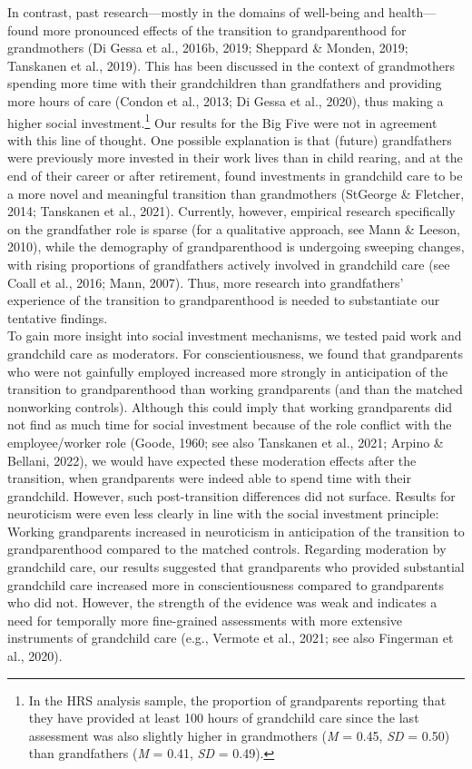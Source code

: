 \documentclass[
  english,
  man,floatsintext]{apa7}
\begin{document}
In contrast, past research---mostly in the domains of well-being and health---found more pronounced effects of the transition to grandparenthood for grandmothers (Di Gessa et al., 2016b, 2019; Sheppard \& Monden, 2019; Tanskanen et al., 2019). This has been discussed in the context of grandmothers spending more time with their grandchildren than grandfathers and providing more hours of care (Condon et al., 2013; Di Gessa et al., 2020), thus making a higher social investment.\footnote{In the HRS analysis sample, the proportion of grandparents reporting that they have provided at least 100 hours of grandchild care since the last assessment was also slightly higher in grandmothers (\emph{M} = 0.45, \emph{SD} = 0.50) than grandfathers (\emph{M} = 0.41, \emph{SD} = 0.49).} Our results for the Big Five were not in agreement with this line of thought. One possible explanation is that (future) grandfathers were previously more invested in their work lives than in child rearing, and at the end of their career or after retirement, found investments in grandchild care to be a more novel and meaningful transition than grandmothers (StGeorge \& Fletcher, 2014; Tanskanen et al., 2021). Currently, however, empirical research specifically on the grandfather role is sparse (for a qualitative approach, see Mann \& Leeson, 2010), while the demography of grandparenthood is undergoing sweeping changes, with rising proportions of grandfathers actively involved in grandchild care (see Coall et al., 2016; Mann, 2007). Thus, more research into grandfathers' experience of the transition to grandparenthood is needed to substantiate our tentative findings.\\
To gain more insight into social investment mechanisms, we tested paid work and grandchild care as moderators. For conscientiousness, we found that grandparents who were not gainfully employed increased more strongly in anticipation of the transition to grandparenthood than working grandparents (and than the matched nonworking controls). Although this could imply that working grandparents did not find as much time for social investment because of the role conflict with the employee/worker role (Goode, 1960; see also Tanskanen et al., 2021; Arpino \& Bellani, 2022), we would have expected these moderation effects after the transition, when grandparents were indeed able to spend time with their grandchild. However, such post-transition differences did not surface. Results for neuroticism were even less clearly in line with the social investment principle: Working grandparents increased in neuroticism in anticipation of the transition to grandparenthood compared to the matched controls. Regarding moderation by grandchild care, our results suggested that grandparents who provided substantial grandchild care increased more in conscientiousness compared to grandparents who did not. However, the strength of the evidence was weak and indicates a need for temporally more fine-grained assessments with more extensive instruments of grandchild care (e.g., Vermote et al., 2021; see also Fingerman et al., 2020).\\
\end{document}
